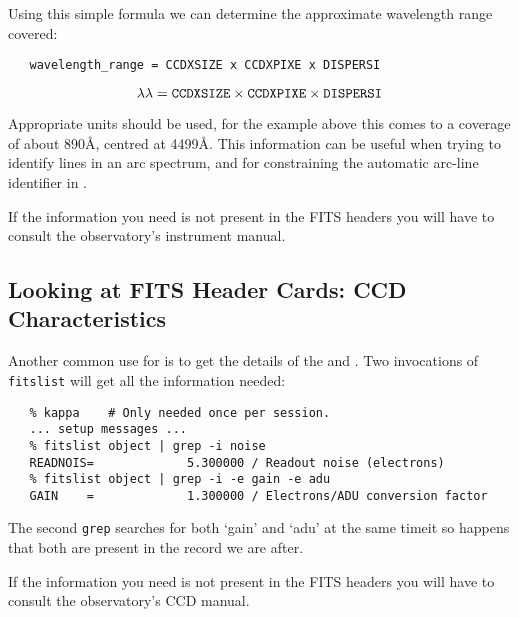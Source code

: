 {{Using this simple formula we can determine
the approximate wavelength range covered:

\begin{htmlonly}
\begin{verbatim}
   wavelength_range = CCDXSIZE x CCDXPIXE x DISPERSI
\end{verbatim}
\end{htmlonly}
\begin{latexonly}
\begin{displaymath}
\lambda\lambda = {\tt{CCDXSIZE}} \times {\tt{CCDXPIXE}} \times {\tt{DISPERSI}}
\end{displaymath}
\end{latexonly}

Appropriate units should be used, for the example above this comes to
a coverage of about 890\AA , centred at 4499\AA\@.  This information can
be useful when trying to identify lines in an arc spectrum, and for
constraining the automatic arc-line identifier in
\@.

If the information you need is not present in the FITS
headers you will have to consult the observatory's instrument manual.


\subsection{Looking at FITS Header Cards: CCD
            Characteristics}

Another common use for  is to
get the details of the 
and \@.
Two invocations of \verb+fitslist+ will get all the information needed:

{
\scspec{\small}{ }
\begin{verbatim}
   % kappa    # Only needed once per session.
   ... setup messages ...
   % fitslist object | grep -i noise
   READNOIS=             5.300000 / Readout noise (electrons)
   % fitslist object | grep -i -e gain -e adu
   GAIN    =             1.300000 / Electrons/ADU conversion factor
\end{verbatim}
}

The second \verb+grep+ searches for both `gain' and `adu' at the same
time\scspec{---}{ - }it so happens that both are present in the record
we are after.

If the information you need is not present in the FITS
headers you will have to consult the observatory's CCD manual.

}}

